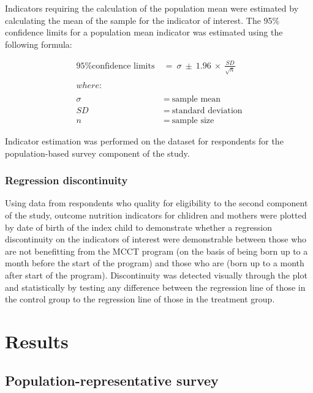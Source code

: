 \documentclass[12pt,a4paper]{article}
\begin{document}
Indicators requiring the calculation of the population mean were estimated by calculating the mean of the sample for the indicator of interest. The 95\% confidence limits for a population mean indicator was estimated using the following formula:

\[
\begin{aligned}
\text{95\% confidence limits} & ~ = ~ \sigma ~ \pm ~ 1.96 ~ \times ~ \frac{SD}{\sqrt{n}} \\
\\
where: & \\
\\
\sigma & ~ = ~ \text{sample mean} \\
SD & ~ = ~ \text{standard deviation} \\
n & ~ = ~ \text{sample size}
\end{aligned}
\]

Indicator estimation was performed on the dataset for respondents for the population-based survey component of the study.

\hypertarget{regression-discontinuity}{%
\subsubsection{Regression discontinuity}\label{regression-discontinuity}}

Using data from respondents who quality for eligibility to the second component of the study, outcome nutrition indicators for chlidren and mothers were plotted by date of birth of the index child to demonstrate whether a regression discontinuity on the indicators of interest were demonstrable between those who are not benefitting from the MCCT program (on the basis of being born up to a month before the start of the program) and those who are (born up to a month after start of the program). Discontinuity was detected visually through the plot and statistically by testing any difference between the regression line of those in the control group to the regression line of those in the treatment group.

\newpage

\hypertarget{results}{%
\section{Results}\label{results}}

\hypertarget{study1-results}{%
\subsection{Population-representative survey}\label{study1-results}}
\end{document}
